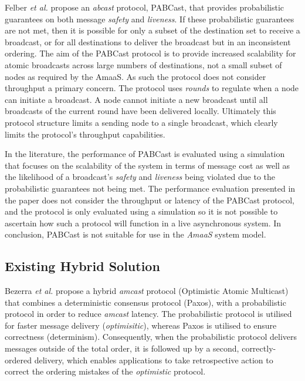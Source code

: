     Felber \emph{et al.} \citep{Felber01probabilisticatomic} propose an \emph{abcast} protocol, \textsf{PABCast}, that provides probabilistic guarantees on both message \emph{safety} and \emph{liveness}.  If these probabilistic guarantees are not met, then it is possible for only a subset of the destination set to receive a broadcast, or for all destinations to deliver the broadcast but in an inconsistent ordering.  The aim of the  \textsf{PABCast} protocol is to provide increased scalability for atomic broadcasts across large numbers of destinations, not a small subset of nodes as required by the \textsf{AmaaS}.  As such the protocol does not consider throughput a primary concern.  The protocol uses \emph{rounds} to regulate when a node can initiate a broadcast.  A node cannot initiate a new broadcast until all broadcasts of the current round have been delivered locally.  Ultimately this protocol structure limits a sending node to a single broadcast, which clearly limits the protocol's throughput capabilities.  
    
    In the literature, the performance of \textsf{PABCast} is evaluated using a simulation that focuses on the scalability of the system in terms of message cost as well as the likelihood of a broadcast's \emph{safety} and \emph{liveness} being violated due to the probabilistic guarantees not being met. The performance evaluation presented in the paper does not consider the throughput or latency of the \textsf{PABCast} protocol, and the protocol is only evaluated using a simulation so it is not possible to ascertain how such a protocol will function in a live asynchronous system.  In conclusion, \textsf{PABCast} is not suitable for use in the \emph{AmaaS} system model.  
    
    
    \subsection{Existing Hybrid Solution}
    Bezerra \emph{et al.}\citep{6681607} propose a hybrid \emph{amcast} protocol (Optimistic Atomic Multicast) that combines a deterministic consensus protocol (Paxos), with a probabilistic protocol in order to reduce \emph{amcast} latency.  The probabilistic protocol is utilised for faster message delivery (\emph{optimisitic}), whereas Paxos is utilised to ensure correctness (determinism).  Consequently, when the probabilistic protocol delivers messages outside of the total order, it is followed up by a second, correctly-ordered delivery, which enables applications to take retrospective action to correct the ordering mistakes of the \emph{optimistic} protocol.  
    
